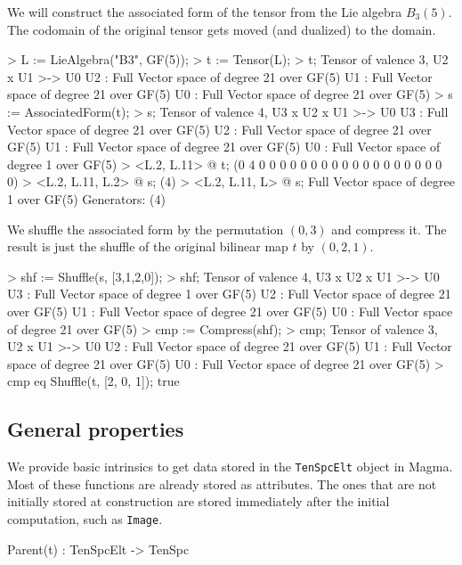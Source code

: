 \begin{example}[CompressAssocForm]

We will construct the associated form of the tensor from the Lie algebra $B_3(5)$. 
The codomain of the original tensor gets moved (and dualized) to the domain. 
\begin{code}
> L := LieAlgebra("B3", GF(5));
> t := Tensor(L); 
> t;
Tensor of valence 3, U2 x U1 >-> U0
U2 : Full Vector space of degree 21 over GF(5)
U1 : Full Vector space of degree 21 over GF(5)
U0 : Full Vector space of degree 21 over GF(5)
> s := AssociatedForm(t);
> s;
Tensor of valence 4, U3 x U2 x U1 >-> U0
U3 : Full Vector space of degree 21 over GF(5)
U2 : Full Vector space of degree 21 over GF(5)
U1 : Full Vector space of degree 21 over GF(5)
U0 : Full Vector space of degree 1 over GF(5)
> <L.2, L.11> @ t;
(0 4 0 0 0 0 0 0 0 0 0 0 0 0 0 0 0 0 0 0 0)
> <L.2, L.11, L.2> @ s;
(4)
> <L.2, L.11, L> @ s;
Full Vector space of degree 1 over GF(5)
Generators:
(4)
\end{code}

We shuffle the associated form by the permutation $(0,3)$ and compress it.
The result is just the shuffle of the original bilinear map $t$ by $(0,2,1)$.

\begin{code}
> shf := Shuffle(s, [3,1,2,0]);
> shf;
Tensor of valence 4, U3 x U2 x U1 >-> U0
U3 : Full Vector space of degree 1 over GF(5)
U2 : Full Vector space of degree 21 over GF(5)
U1 : Full Vector space of degree 21 over GF(5)
U0 : Full Vector space of degree 21 over GF(5)
> cmp := Compress(shf);
> cmp;
Tensor of valence 3, U2 x U1 >-> U0
U2 : Full Vector space of degree 21 over GF(5)
U1 : Full Vector space of degree 21 over GF(5)
U0 : Full Vector space of degree 21 over GF(5)
> cmp eq Shuffle(t, [2, 0, 1]);
true
\end{code}
\end{example}

\subsection{General properties}

We provide basic intrinsics to get data stored in the \texttt{TenSpcElt} object
in \textsf{Magma}. Most of these functions are already stored as attributes. The ones
that are not initially stored at construction are stored immediately after the
initial computation, such as \texttt{Image}.

\begin{intrinsics}
Parent(t) : TenSpcElt -> TenSpc
\end{intrinsics}

